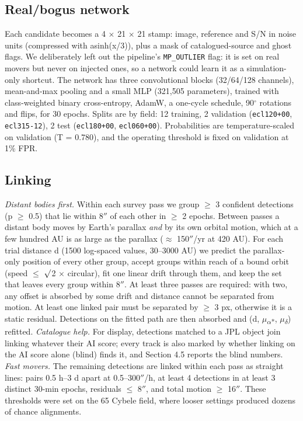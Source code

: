 \documentclass[twocolumn]{aastex631}
\begin{document}
\subsection{Real/bogus network}
Each candidate becomes a 4 $\times$ 21 $\times$ 21 stamp: image, reference and S/N in noise units (compressed with asinh(x/3)), plus a mask of catalogued-source and ghost flags. We deliberately left out the pipeline's \texttt{MP\_OUTLIER} flag: it is set on real movers but never on injected ones, so a network could learn it as a simulation-only shortcut. The network has three convolutional blocks (32/64/128 channels), mean-and-max pooling and a small MLP (321,505 parameters), trained with class-weighted binary cross-entropy, AdamW, a one-cycle schedule, 90$^\circ$ rotations and flips, for 30 epochs. Splits are by field: 12 training, 2 validation (\texttt{ecl120+00}, \texttt{ecl315-12}), 2 test (\texttt{ecl180+00}, \texttt{ecl060+00}). Probabilities are temperature-scaled on validation (T = 0.780), and the operating threshold is fixed on validation at 1\% FPR.

\subsection{Linking}
\emph{Distant bodies first.} Within each survey pass we group $\ge$ 3 confident detections (p $\ge$ 0.5) that lie within 8$''$ of each other in $\ge$ 2 epochs. Between passes a distant body moves by Earth's parallax \emph{and} by its own orbital motion, which at a few hundred AU is as large as the parallax ($\approx$ 150$''$/yr at 420 AU). For each trial distance d (1500 log-spaced values, 30--3000 AU) we predict the parallax-only position of every other group, accept groups within reach of a bound orbit (speed $\le$ $\surd$2 $\times$ circular), fit one linear drift through them, and keep the set that leaves every group within 8$''$. At least three passes are required: with two, any offset is absorbed by some drift and distance cannot be separated from motion. At least one linked pair must be separated by $\ge$ 3 px, otherwise it is a static residual. Detections on the fitted path are then absorbed and (d, $\mu$\textsubscript{$\alpha$*}, $\mu$\textsubscript{$\delta$}) refitted. \emph{Catalogue help.} For display, detections matched to a JPL object join linking whatever their AI score; every track is also marked by whether linking on the AI score alone (blind) finds it, and Section 4.5 reports the blind numbers. \emph{Fast movers.} The remaining detections are linked within each pass as straight lines: pairs 0.5 h--3 d apart at 0.5--300$''$/h, at least 4 detections in at least 3 distinct 30-min epochs, residuals $\le$ 8$''$, and total motion $\ge$ 16$''$. These thresholds were set on the 65 Cybele field, where looser settings produced dozens of chance alignments.
\end{document}
